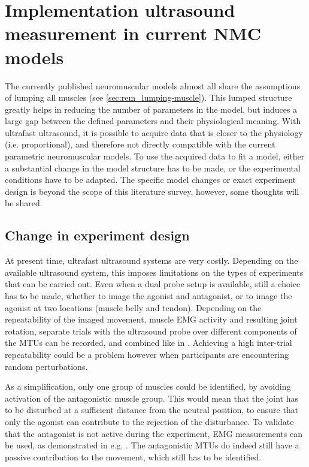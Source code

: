 \section{Implementation ultrasound measurement in current NMC models}
\label{sec:rem_incompatibility}
The currently published neuromuscular models almost all share the assumptions of lumping all muscles (see \autoref{sec:rem_lumping-muscle}). This lumped structure greatly helps in reducing the number of parameters in the model, but induces a large gap between the defined parameters and their physiological meaning. With ultrafast ultrasound, it is possible to acquire data that is closer to the physiology (i.e. proportional), and therefore not directly compatible with the current parametric neuromuscular models. To use the acquired data to fit a model, either a substantial change in the model structure has to be made, or the experimental conditions have to be adapted. The specific model changes or exact experiment design is beyond the scope of this literature survey, however, some thoughts will be shared.



\subsection{Change in experiment design}
At present time, ultrafast ultrasound systems are very costly. Depending on the available ultrasound system, this imposes limitations on the types of experiments that can be carried out. Even when a dual probe setup is available, still a choice has to be made, whether to image the agonist and antagonist, or to image the agonist at two locations (muscle belly and tendon). Depending on the repeatability of the imaged movement, muscle EMG activity and resulting joint rotation, separate trials with the ultrasound probe over different components of the MTUs can be recorded, and combined like in \cite{hauraix_muscle_2017, farcy_interaction_2014}. Achieving a high inter-trial repeatability could be a problem however when participants are encountering random perturbations. 

As a simplification, only one group of muscles could be identified, by avoiding activation of the antagonistic muscle group. This would mean that the joint has to be disturbed at a sufficient distance from the neutral position, to ensure that only the agonist can contribute to the rejection of the disturbance. To validate that the antagonist is not active during the experiment, EMG measurements can be used, as demonstrated in e.g. \cite{kearney_identification_1997, mirbagheri_intrinsic_2000}. The antagonistic MTUs do indeed still have a passive contribution to the movement, which still has to be identified. 

